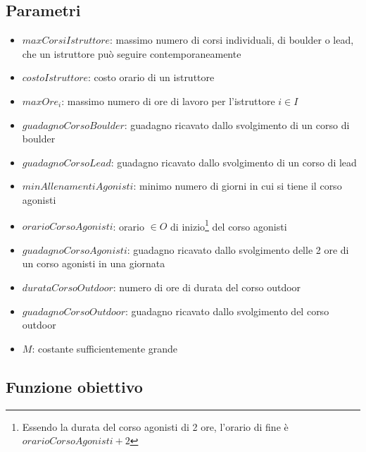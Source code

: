 \subsection{Parametri}
\begin{itemize}
	\item $maxCorsiIstruttore$: massimo numero di corsi individuali, di boulder o lead, che un istruttore può seguire contemporaneamente
	\item $costoIstruttore$: costo orario di un istruttore
	\item $maxOre_i$: massimo numero di ore di lavoro per l'istruttore $i \in I$
	\item $guadagnoCorsoBoulder$: guadagno ricavato dallo svolgimento di un corso di boulder
	\item $guadagnoCorsoLead$: guadagno ricavato dallo svolgimento di un corso di lead
	\item $minAllenamentiAgonisti$: minimo numero di giorni in cui si tiene il corso agonisti
	\item $orarioCorsoAgonisti$: orario $\in O$ di inizio\footnote{Essendo la durata del corso agonisti di 2 ore, l'orario di fine è $orarioCorsoAgonisti + 2$} del corso agonisti
	\item $guadagnoCorsoAgonisti$: guadagno ricavato dallo svolgimento delle 2 ore di un corso agonisti in una giornata
	\item $durataCorsoOutdoor$: numero di ore di durata del corso outdoor
	\item $guadagnoCorsoOutdoor$: guadagno ricavato dallo svolgimento del corso outdoor
	\item $M$: costante sufficientemente grande
\end{itemize}

\subsection{Funzione obiettivo}

